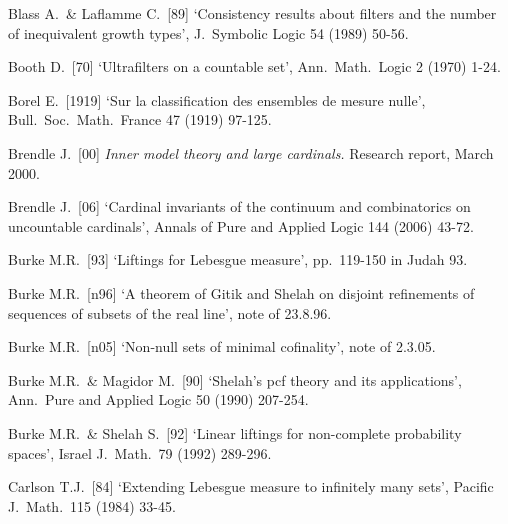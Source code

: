 {%


Blass A.\ \& Laflamme C.\ [89] `Consistency results about filters and the
number of inequivalent growth types', J.\ Symbolic Logic 54 (1989) 50-56.
\cmmnt{[5A6Ib, 5A6J.]}

Booth D.\ [70] `Ultrafilters on a countable set',
Ann.\ Math.\ Logic 2 (1970) 1-24.
\cmmnt{[517R.]}

Borel E.\ [1919] `Sur la classification des ensembles de mesure nulle', Bull.\ Soc.\ Math.\ France 47 (1919) 97-125.
\cmmnt{[\S534 {\it intro.}]}

Brendle J.\ [00] {\it Inner model theory and large cardinals.}
Research report, March 2000.
\cmmnt{[528N, 529F-529H.]} %


Brendle J.\ [06] `Cardinal invariants of the continuum and combinatorics
on uncountable cardinals',
Annals of Pure and Applied Logic 144 (2006) 43-72.
\cmmnt{[529F, 529H.]}

Burke M.R.\ [93] `Liftings for Lebesgue measure', pp.\ 119-150 in
{\smc Judah 93}.
\cmmnt{[\S535 {\it notes\/}.]}


Burke M.R.\ [n96] `A theorem of Gitik and Shelah on disjoint refinements
of sequences of subsets of the real line', note of 23.8.96.
\cmmnt{[546J, \S547 {\it intro.}]}

Burke M.R.\ [n05] `Non-null sets of minimal cofinality', note of 2.3.05.
\cmmnt{[523K.]}

Burke M.R.\ \& Magidor M.\ [90] `Shelah's pcf theory and
its applications', Ann.\ Pure and Applied Logic 50 (1990) 207-254.
\cmmnt{[513J, \S5A2 {\it intro.}.]}

Burke M.R.\ \& Shelah S.\ [92]
`Linear liftings for non-complete probability spaces',
Israel J.\ Math.\ 79 (1992) 289-296.
\cmmnt{[\S535 {\it notes\/}.]}

\medskip%

Carlson T.J.\ [84] `Extending Lebesgue measure to infinitely many sets',
Pacific J.\ Math.\ 115 (1984) 33-45.
\cmmnt{[552N, \S552 {\it notes.}]}

}
